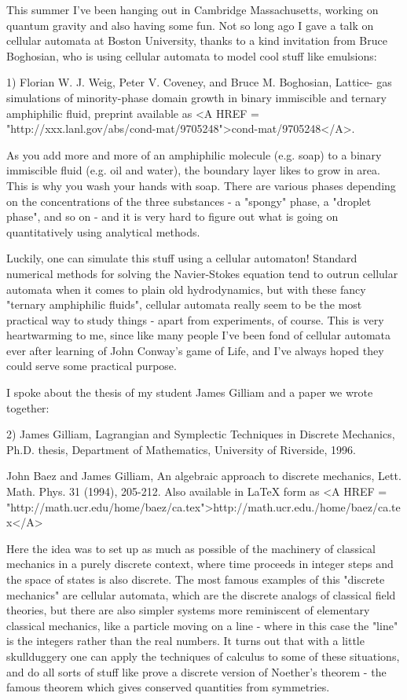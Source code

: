 

This summer I've been hanging out in Cambridge Massachusetts, working
on quantum gravity and also having some fun.  Not so long ago I gave a
talk on cellular automata at Boston University, thanks to a kind
invitation from Bruce Boghosian, who is using cellular automata to
model cool stuff like emulsions:

1) Florian W. J. Weig, Peter V. Coveney, and Bruce M. Boghosian, Lattice-
gas simulations of minority-phase domain growth in binary immiscible and
ternary amphiphilic fluid, preprint available as 
<A HREF = "http://xxx.lanl.gov/abs/cond-mat/9705248">cond-mat/9705248</A>.

As you add more and more of an amphiphilic molecule (e.g. soap) to a
binary immiscible fluid (e.g. oil and water), the boundary layer likes
to grow in area.  This is why you wash your hands with soap.  There
are various phases depending on the concentrations of the three
substances - a "spongy" phase, a "droplet phase", and so on - and
it is very hard to figure out what is going on quantitatively using
analytical methods.  

Luckily, one can simulate this stuff using a cellular automaton!
Standard numerical methods for solving the Navier-Stokes equation tend
to outrun cellular automata when it comes to plain old hydrodynamics,
but with these fancy "ternary amphiphilic fluids", cellular automata
really seem to be the most practical way to study things - apart
from experiments, of course.  This is very heartwarming to me, since
like many people I've been fond of cellular automata ever after
learning of John Conway's game of Life, and I've always hoped they
could serve some practical purpose.

I spoke about the thesis of my student James Gilliam and a paper
we wrote together:

2) James Gilliam, Lagrangian and Symplectic Techniques in Discrete
Mechanics, Ph.D. thesis, Department of Mathematics, University of
Riverside, 1996.

John Baez and James Gilliam, An algebraic approach to discrete mechanics,
Lett. Math. Phys. 31 (1994), 205-212.   Also available in LaTeX form as
<A HREF = "http://math.ucr.edu/home/baez/ca.tex">http://math.ucr.edu./home/baez/ca.tex</A>

Here the idea was to set up as much as possible of the machinery of
classical mechanics in a purely discrete context, where time proceeds
in integer steps and the space of states is also discrete.  The most
famous examples of this "discrete mechanics" are cellular automata,
which are the discrete analogs of classical field theories, but there
are also simpler systems more reminiscent of elementary classical
mechanics, like a particle moving on a line - where in this case the
"line" is the integers rather than the real numbers.  It turns out
that with a little skullduggery one can apply the techniques of
calculus to some of these situations, and do all sorts of stuff like
prove a discrete version of Noether's theorem - the famous theorem
which gives conserved quantities from symmetries.

